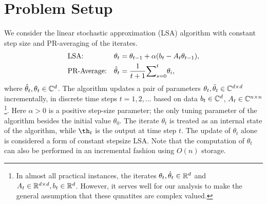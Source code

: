 \section{Problem Setup}
We consider the linear stochastic approximation (LSA) algorithm with constant step size and PR-averaging of the iterates.
\begin{subequations}\label{eq:lsa}
\begin{align}
\label{conststep}&\text{LSA:} &\theta_t&=\theta_{t-1}+\alpha(b_t-A_t\theta_{t-1}),\\
\label{iteravg}&\text{PR-Average:} &\hat{\theta}_t&=\frac{1}{t+1}{\sum}_{s=0}^{t}\theta_i,
\end{align}
\end{subequations}
where $\hat{\theta}_t, \theta_t \in \mathbb{C}^{d}$. The algorithm updates a pair of parameters $\theta_t,\bar{\theta}_t\in \mathbb{C}^{d \times d}$ incrementally, in discrete time steps $t=1,2,\dots$
based on data $b_t\in \mathbb{C}^d$, $A_t\in \mathbb{C}^{n\times n}$\footnote{In almost all practical instances, the iterates $\theta_t,\hat{\theta}_t\in \mathbb{R}^d$ and $A_t\in \mathbb{R}^{d \times d}, b_t\in \mathbb{R}^d$. However, it serves well for our analysis to make the general assumption that these qunatites are complex valued.}. Here $\alpha>0$ is a positive step-size parameter; the only tuning parameter of the algorithm besides the
initial value $\theta_0$. The iterate $\theta_t$ is treated as an internal state of the algorithm, while $\th_t$ is the output at time step $t$. The update of $\theta_t$ alone is considered a form of constant stepsize LSA. Note that the computation of $\theta_t$ can also be performed in an incremental fashion using $O(n)$ storage.

